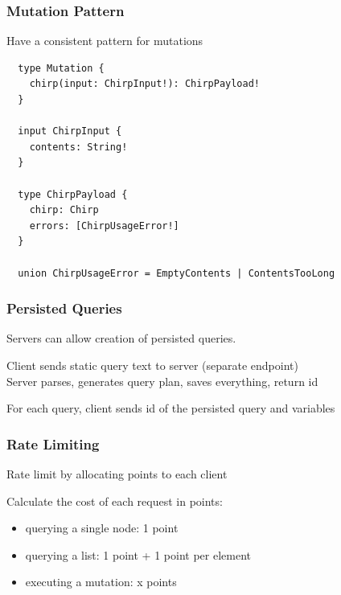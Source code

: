 \documentclass{beamer}
\begin{document}
\begin{frame}[fragile]
  \frametitle{Mutation Pattern}
  Have a consistent pattern for mutations

  \begin{verbatim}
  type Mutation {
    chirp(input: ChirpInput!): ChirpPayload!
  }

  input ChirpInput {
    contents: String!
  }

  type ChirpPayload {
    chirp: Chirp
    errors: [ChirpUsageError!]
  }

  union ChirpUsageError = EmptyContents | ContentsTooLong
  \end{verbatim}
\end{frame}


\begin{frame}
  \frametitle{Persisted Queries}
  Servers can allow creation of persisted queries.

  \vspace{1em}
  Client sends static query text to server (separate endpoint)\\
  Server parses, generates query plan, saves everything, return id

  \vspace{1em}
  For each query, client sends id of the persisted query and variables
\end{frame}


\begin{frame}
  \frametitle{Rate Limiting}
  Rate limit by allocating points to each client

  \vspace{1em}
  Calculate the cost of each request in points:
  \begin{itemize}
  \item querying a single node: 1 point
  \item querying a list: 1 point + 1 point per element
  \item executing a mutation: x points
  \end{itemize}
\end{frame}
\end{document}
